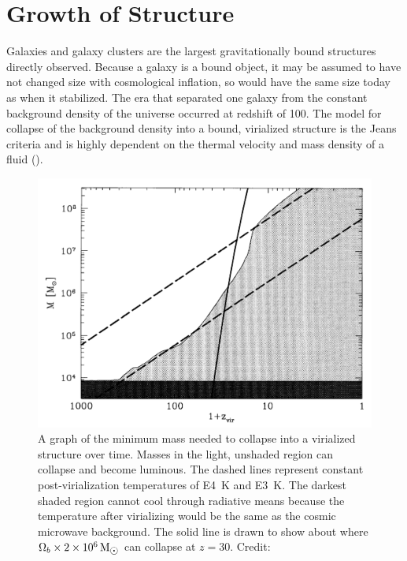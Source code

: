\documentclass{paper}
\begin{document}
\section*{Growth of Structure}
  Galaxies and galaxy clusters are the largest gravitationally
  bound structures directly observed. Because a galaxy is a bound object,
  it may be assumed to have not changed size with cosmological inflation,
  so would have the same size today as when it stabilized. 
  The era that separated one galaxy from the 
  constant background density of the universe occurred at redshift of 100.
  The model for collapse of the background density into a bound, virialized
  structure is the Jeans criteria and is highly dependent on the thermal 
  velocity and mass density of a fluid (\cite{Jeans1902}).

  \begin{figure}[H]
    \begin{centering}
    \includegraphics[scale=0.4]{Struct-mass.pdf}
    \caption{A graph of the minimum mass needed to collapse into a virialized
      structure over time. Masses in 
      the light, unshaded region can collapse and become luminous. 
      The dashed lines represent 
      constant post-virialization temperatures of \SI{E4}{K} and \SI{E3}{K}. 
      The darkest shaded region cannot cool through radiative means because 
      the temperature after virializing would be the same as the cosmic 
      microwave background. The solid line is drawn to show about where 
      \(\Omega_b \times \SI{2E6}{M_{\astrosun}}\) can collapse at \(z=30\).
    Credit: \cite{1997ApJ...474....1T}}
    \label{fig:Struct-mass}
    \end{centering}
  \end{figure}
\end{document}
